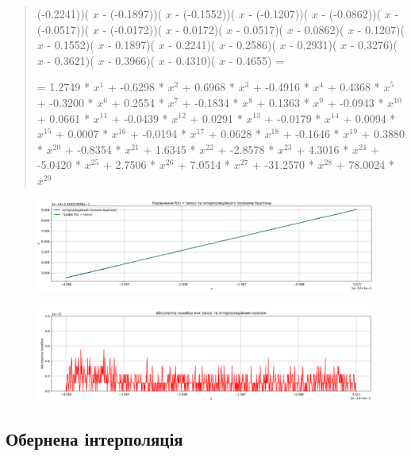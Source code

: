 \documentclass[a4paper, 12pt]{article}
\begin{document}
\begin{quote}
(-0.2241))( \( x \)  - (-0.1897))( \( x \)  - (-0.1552))( \( x \)  - (-0.1207))( \( x \)  - (-0.0862))( \( x \)  - (-0.0517))( \( x \)  - (-0.0172))( \( x \)  - 0.0172)( \( x \)  - 0.0517)( \( x \)  - 0.0862)( \( x \)  - 0.1207)( \( x \)  - 0.1552)( \( x \)  - 0.1897)( \( x \)  - 0.2241)( \( x \)  - 0.2586)( \( x \)  - 0.2931)( \( x \)  - 0.3276)( \( x \)  - 0.3621)( \( x \)  - 0.3966)( \( x \)  - 0.4310)( \( x \)  - 0.4655) =

	= 1.2749 * \( x^1 \) + -0.6298 * \( x^2 \) + 0.6968 * \( x^3 \) + -0.4916 * \( x^4 \) + 0.4368 * \( x^5 \) + -0.3200 * \( x^6 \) + 0.2554 * \( x^7 \) + -0.1834 * \( x^8 \) + 0.1363 * \( x^9 \) + -0.0943 * \( x^{10} \) + 0.0661 * \( x^{11} \) + -0.0439 * \( x^{12} \) + 0.0291 * \( x^{13} \) + -0.0179 * \( x^{14} \) + 0.0094 * \( x^{15} \) + 0.0007 * \( x^{16} \) + -0.0194 * \( x^{17} \) + 0.0628 * \( x^{18} \) + -0.1646 * \( x^{19} \) + 0.3880 * \( x^{20} \) + -0.8354 * \( x^{21} \) + 1.6345 * \( x^{22} \) + -2.8578 * \( x^{23} \) + 4.3016 * \( x^{24} \) + -5.0420 * \( x^{25} \) + 2.7506 * \( x^{26} \) + 7.0514 * \( x^{27} \) + -31.2570 * \( x^{28} \) + 78.0024 * \( x^{29} \)
\end{quote}

\newpage
\begin{figure}[ht]
	\centering
	\includegraphics[width=1\linewidth]{./img/program1_out.png}
\end{figure}

\begin{figure}[ht]
	\centering
	\includegraphics[width=1\linewidth]{./img/program1_out_err.png}
\end{figure}


\newpage
\subsection{Обернена інтерполяція}
\end{document}
